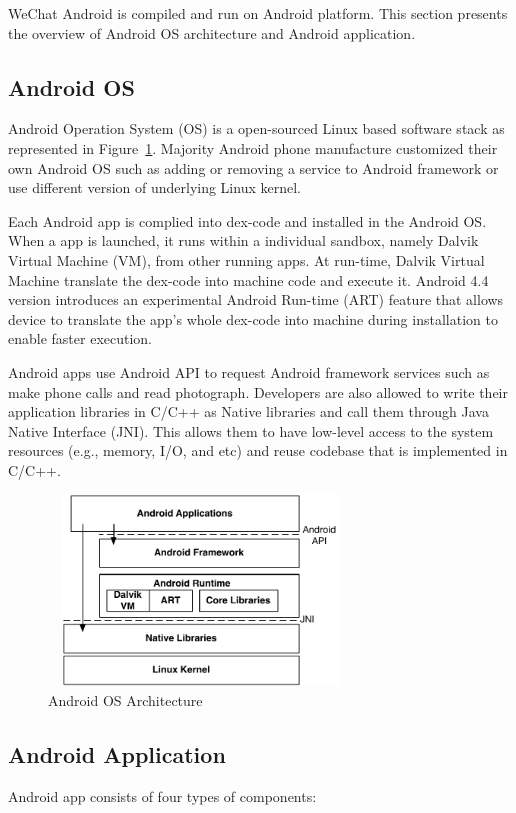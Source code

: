 WeChat Android is compiled and run on Android platform. This section presents the overview 
of Android OS architecture and Android application. 
\subsection{Android OS}
Android Operation System (OS) is a open-sourced Linux based software stack as represented in 
Figure~\ref{fig:androw_framework}. Majority Android phone manufacture customized their own 
Android OS such as adding or removing a service to Android framework or use different version of 
underlying Linux kernel.

Each Android app is complied into dex-code and installed in the Android OS. When a app is 
launched, it runs within a individual sandbox, namely Dalvik Virtual Machine (VM), from other 
running apps. At run-time, Dalvik Virtual Machine translate the dex-code into machine code and 
execute it. Android 4.4 version introduces an experimental Android Run-time (ART) feature that 
allows device to translate the app's whole dex-code into machine during installation to enable 
faster execution. 

Android apps use Android API to request Android framework services such as make 
phone calls and read photograph. Developers are also allowed to write their application libraries 
in C/C++ as Native libraries and call them through Java Native Interface (JNI). This allows them 
to have low-level access to the system resources (e.g., memory, I/O, and etc) and reuse 
codebase that is implemented in C/C++.  

\begin{figure}
	\centering
	\includegraphics[height=2in, width=3.2in]{android_framework.pdf}
	\caption{Android OS Architecture}
	\label{fig:androw_framework}
\end{figure}

\subsection{Android Application}
Android app consists of four types of components:

